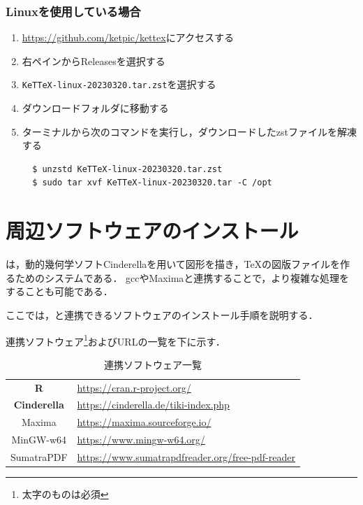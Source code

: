 \subsubsection{Linuxを使用している場合}
\begin{enumerate}
    \item \url{https://github.com/ketpic/kettex}にアクセスする
    \item 右ペインからReleasesを選択する
    \item \verb|KeTTeX-linux-20230320.tar.zst|を選択する
    \item ダウンロードフォルダに移動する
    \item ターミナルから次のコマンドを実行し，ダウンロードしたzstファイルを解凍する
    \begin{lstlisting}
  $ unzstd KeTTeX-linux-20230320.tar.zst
  $ sudo tar xvf KeTTeX-linux-20230320.tar -C /opt
    \end{lstlisting}
\end{enumerate}

\section{周辺ソフトウェアのインストール}

{\ketcindy}は，動的幾何学ソフトCinderellaを用いて図形を描き，{\TeX}の図版ファイルを作るためのシステムである．
gccやMaximaと連携することで，より複雑な処理をすることも可能である．

ここでは，{\ketcindy}と連携できるソフトウェアのインストール手順を説明する．

連携ソフトウェア\footnote{太字のものは必須}およびURLの一覧を下に示す．

\begin{table}[h]
    \centering
    \caption{連携ソフトウェア一覧}
    \label{tab:download}
    \begin{tabular}{c||l}
        \textbf{R}           & \url{https://cran.r-project.org/}\\
        \textbf{Cinderella}  & \url{https://cinderella.de/tiki-index.php}\\
        Maxima      & \url{https://maxima.sourceforge.io/}\\
        MinGW-w64   & \url{https://www.mingw-w64.org/}\\
        SumatraPDF  & \url{https://www.sumatrapdfreader.org/free-pdf-reader}
    \end{tabular}
\end{table}

